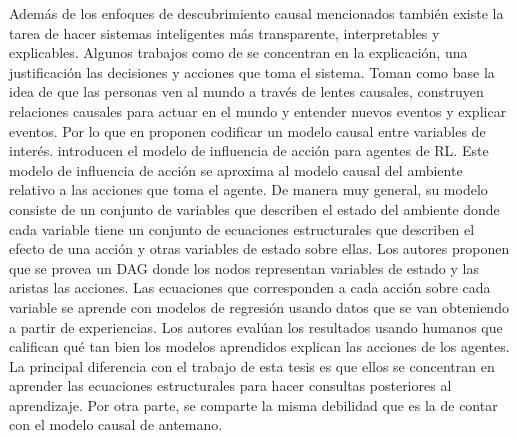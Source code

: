 Además de los enfoques de descubrimiento causal mencionados también existe la tarea de hacer sistemas inteligentes más transparente, interpretables y explicables. Algunos trabajos como de \cite{shi2020selfsupervised, madumal2019explainable} se concentran en la explicación, una justificación las decisiones y acciones que toma el sistema. Toman como base la idea de que las personas ven al mundo a través de lentes causales, construyen relaciones causales para actuar en el mundo y entender nuevos eventos y explicar eventos. Por lo que en \cite{madumal2019explainable} proponen codificar un modelo causal entre variables de interés. introducen el modelo de influencia de acción para agentes de RL. Este modelo de influencia de acción se aproxima al modelo causal del ambiente relativo a las acciones que toma el agente. De manera muy general, su modelo consiste de un conjunto de variables que describen el estado del ambiente donde cada variable tiene un conjunto de ecuaciones estructurales que describen el efecto de una acción y otras variables de estado sobre ellas. Los autores proponen que se provea un DAG donde los nodos representan variables de estado y las aristas las acciones. Las ecuaciones que corresponden a cada acción sobre cada variable se aprende con modelos de regresión usando datos que se van obteniendo a partir de experiencias. Los autores evalúan los resultados usando humanos que califican qué tan bien los modelos aprendidos explican las acciones de los agentes. La principal diferencia con el trabajo de esta tesis es que ellos se concentran en aprender las ecuaciones estructurales para hacer consultas posteriores al aprendizaje. Por otra parte, se comparte la misma debilidad que es la de contar con el modelo causal de antemano.


